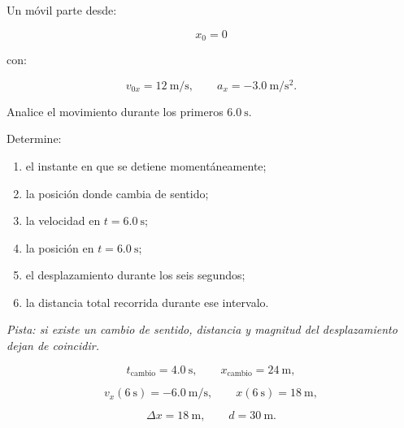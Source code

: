 \begin{ejercicio}
Un móvil parte desde:

\[ x_0=0 \]

con:

\[
v_{0x}=\SI{12}{\meter\per\second},
\qquad
a_x=-\SI{3.0}{\meter\per\second\squared}.
\]

Analice el movimiento durante los primeros \(\SI{6.0}{\second}\).

Determine:

\begin{enumerate}[label=\alph*)]
    \item el instante en que se detiene momentáneamente;
    \item la posición donde cambia de sentido;
    \item la velocidad en \(t=\SI{6.0}{\second}\);
    \item la posición en \(t=\SI{6.0}{\second}\);
    \item el desplazamiento durante los seis segundos;
    \item la distancia total recorrida durante ese intervalo.
\end{enumerate}

\textit{Pista: si existe un cambio de sentido, distancia y magnitud del desplazamiento dejan de coincidir.}
\end{ejercicio}

\begin{respuesta}
\[
t_{\mathrm{cambio}}=\SI{4.0}{\second},
\qquad
x_{\mathrm{cambio}}=\SI{24}{\meter},
\]

\[
v_x(\SI{6}{\second})=-\SI{6.0}{\meter\per\second},
\qquad
x(\SI{6}{\second})=\SI{18}{\meter},
\]

\[
\Delta x=\SI{18}{\meter},
\qquad
d=\SI{30}{\meter}.
\]
\end{respuesta}

